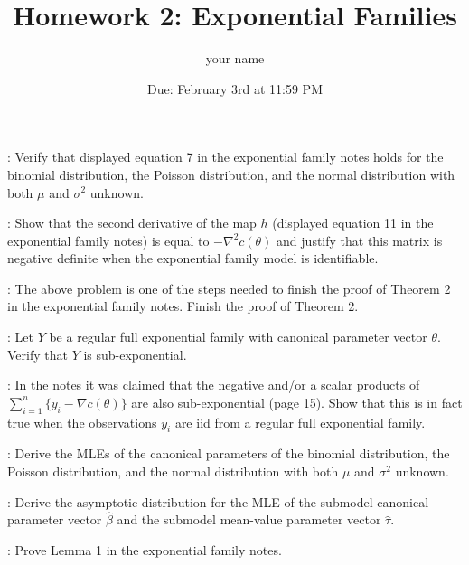 \documentclass[12pt]{article}
\title{Homework 2: Exponential Families}
\author{your name}
\date{Due: February 3rd at 11:59 PM}
\begin{document}
\maketitle


: Verify that displayed equation 7 in the exponential family notes holds for the binomial distribution, the Poisson distribution, and the normal distribution with both $\mu$ and $\sigma^2$ unknown.

\vspace*{1cm}

: Show that the second derivative of the map $h$ (displayed equation 11 in the exponential family notes) is equal to $-\nabla^2 c(\theta)$ and justify that this matrix is negative definite when the exponential family model is identifiable.

\vspace*{1cm}

: The above problem is one of the steps needed to finish the proof of Theorem 2 in the exponential family notes. Finish the proof of Theorem 2.

\vspace*{1cm}

: Let $Y$ be a regular full exponential family with canonical parameter vector $\theta$. Verify that $Y$ is sub-exponential.

\vspace*{1cm}

: In the notes it was claimed that the negative and/or a scalar products of $\sum_{i=1}^n\{y_i - \nabla c(\theta)\}$ are also sub-exponential (page 15). Show that this is in fact true when the observations $y_i$ are iid from a regular full exponential family.

\vspace*{1cm}

: Derive the MLEs of the canonical parameters of the binomial distribution, the Poisson distribution, and the normal distribution with both $\mu$ and $\sigma^2$ unknown.

\vspace*{1cm}

: Derive the asymptotic distribution for the MLE of the submodel canonical parameter vector $\hat\beta$ and the submodel mean-value parameter vector $\hat\tau$.

\vspace*{1cm}

: Prove Lemma 1 in the exponential family notes.

\vspace*{1cm}
\end{document}
